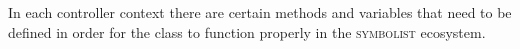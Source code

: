 \documentclass{article}
\def\symbolist{\textsc{symbolist}\xspace}
\def\drawsocket{\textsc{drawsocket}\xspace}
\def\uicontroller{\textit{ui-controller}\xspace}
\def\iocontroller{\textit{io-controller}\xspace}
\begin{document}
In each controller context there are certain methods and variables that need to be defined in order for the class to function properly in the \symbolist ecosystem.


%
%
%
%
%
%
%
\end{document}
